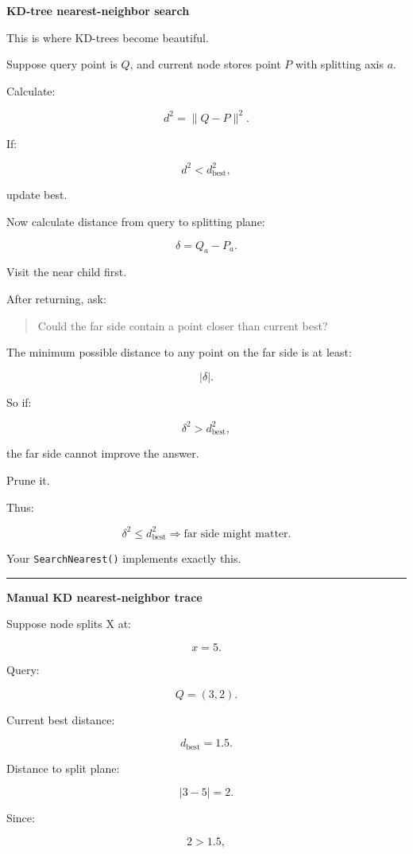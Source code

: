 \textbf{KD-tree nearest-neighbor search}

This is where KD-trees become beautiful.

Suppose query point is \(Q\), and current node stores point \(P\) with splitting axis \(a\).

Calculate:

\[
d^2=\|Q-P\|^2.
\]

If:

\[
d^2<d^2_{\text{best}},
\]

update best.

Now calculate distance from query to splitting plane:

\[
\delta=Q_a-P_a.
\]

Visit the near child first.

After returning, ask:

\begin{quote}
Could the far side contain a point closer than current best?
\end{quote}

The minimum possible distance to any point on the far side is at least:

\[
|\delta|.
\]

So if:

\[
\delta^2>d^2_{\text{best}},
\]

the far side cannot improve the answer.

Prune it.

Thus:

\[
\boxed{
\delta^2
\le
d^2_{\text{best}}
\Rightarrow
\text{far side might matter}.
}
\]

Your \texttt{SearchNearest()} implements exactly this.

\begin{center}\rule{0.5\linewidth}{0.5pt}\end{center}

\textbf{Manual KD nearest-neighbor trace}

Suppose node splits X at:

\[
x=5.
\]

Query:

\[
Q=(3,2).
\]

Current best distance:

\[
d_{\text{best}}=1.5.
\]

Distance to split plane:

\[
|3-5|=2.
\]

Since:

\[
2>1.5,
\]

